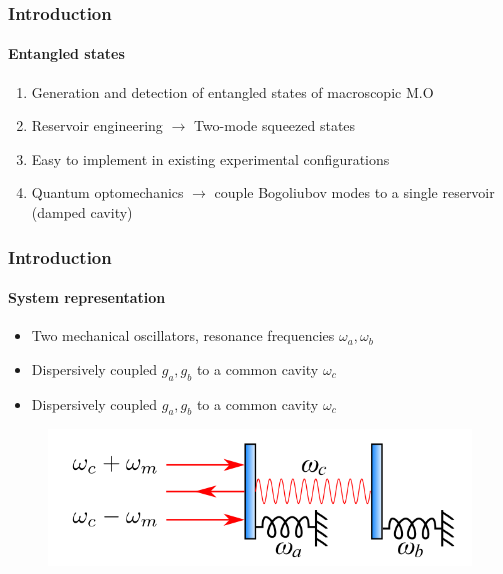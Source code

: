 \documentclass[aspectratio=43]{beamer}
\begin{document}
\begin{frame}

	\frametitle{Introduction}
	\framesubtitle{Entangled states}

	\begin{enumerate}
		\item Generation and detection of entangled states of macroscopic M.O
		\item Reservoir engineering $\longrightarrow$ Two-mode squeezed states
		\item Easy to implement in existing experimental configurations
		\item Quantum optomechanics $\longrightarrow$ couple Bogoliubov modes to a single reservoir (damped cavity)
	\end{enumerate}	
	
\end{frame}

\begin{frame}

	\frametitle{Introduction}
	\framesubtitle{System representation}
	
	\begin{itemize}
		\item Two mechanical oscillators, resonance frequencies $\omega_{a}, \omega_{b}$
		\item Dispersively coupled $g_{a}, g_{b}$ to a common cavity $\omega_{c}$
		\item Dispersively coupled $g_{a}, g_{b}$ to a common cavity $\omega_{c}$
	\end{itemize}

		\begin{figure}
			\includegraphics[width = 8 cm]{plots/plot_system.png}
		\end{figure}	

\end{frame}
\end{document}
